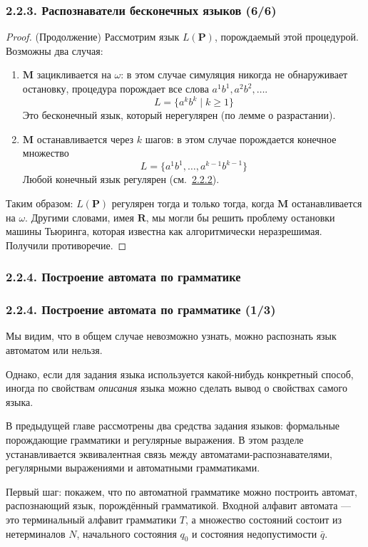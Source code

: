 \documentclass[mathserif,12pt,aspectratio=169]{beamer}
\def\emразделенной{\em разделенной}
\def\em#1{\it\color{blue}#1}
\def\Bl#1{\mathbf{#1}}
\let\ge\geqslant
\def\DMref#1#2{{\color{blue}\underline{\hyperlink{#2}{#1}}}}
\begin{document}
\begin{frame}
\frametitle{2.2.3. Распознаватели бесконечных языков (6/6)}
\begin{proof} (Продолжение)
Рассмотрим язык $L(\Bl{P})$, порождаемый этой процедурой.
Возможны два случая:
\begin{enumerate}
    \item $\Bl{M}$ зацикливается на $\omega$:
    в этом случае симуляция никогда не обнаруживает остановку, 
    процедура порождает все слова $a^1 b^1, a^2 b^2, \dots$.
    $$L = \{a^k b^k \mid k \ge 1\}$$
    Это бесконечный язык, который нерегулярен (по лемме о разрастании).
    \item $\Bl{M}$ останавливается через $k$ шагов:
 в этом случае порождается конечное множество
    $$L = \{a^1 b^1, \dots, a^{k-1} b^{k-1}\}$$
    Любой конечный язык регулярен (см.~\DMref{2.2.2}{2.2.2.}).
\end{enumerate}

Таким образом: $L(\Bl{P})$ регулярен тогда и только тогда, когда   $\Bl{M}$ останавливается на  $\omega$. Другими словами,
имея $\Bl{R}$, мы могли бы решить проблему остановки машины Тьюринга, которая известна как алгоритмически неразрешимая. 
Получили противоречие.
\end{proof}
\end{frame}

\subsubsection{2.2.4. Построение автомата по грамматике}\label{2.2.4.}
\begin{frame}
\frametitle{2.2.4. Построение автомата по грамматике (1/3)}
Мы видим, что в общем случае 
невозможно узнать, 
можно распознать язык автоматом или нельзя. 

\smallskip
Однако, если для задания языка используется какой-нибудь
конкретный способ, иногда по свойствам 
{\em описания} языка можно
сделать вывод о свойствах самого языка.

\smallskip
В предыдущей главе рассмотрены два средства задания
языков: формальные порождающие грамматики и регулярные выражения.
В этом разделе устанавливается эквивалентная связь между
автоматами-распознавателями,
регулярными выражениями и
автоматными грамматиками.


Первый шаг: покажем, что по автоматной грамматике можно построить
автомат, распознающий язык, порождённый грамматикой.
Входной алфавит автомата --- это терминальный алфавит грамматики $T$, а  множество состояний состоит из нетерминалов $N$,
 начального состояния $q_0$ и состояния недопустимости $\bar{q}$. 
\end{frame}
\end{document}
